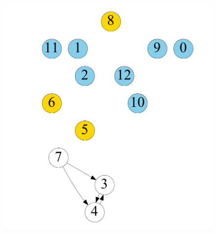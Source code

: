 \begin{figure}[t]
\begin{minipage}[b]{0.19\linewidth}
        \end{minipage}
    \begin{minipage}[b]{0.19\linewidth}
            \centering
			{\includegraphics[width=\textwidth]{./alg_fig/simple-g6}}
   		\end{minipage}                  
    \begin{minipage}[b]{0.19\linewidth}
            \centering

\end{minipage}
\end{figure}
